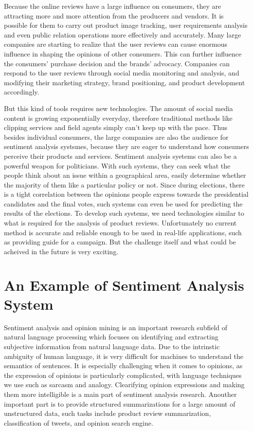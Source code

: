 Because the online reviews have a large influence on consumers, they are attracting more and more attention from the producers and vendors. It is possible for them to carry out product image tracking, user requirements analysis and even public relation operations more effectively and accurately.  
Many large companies are starting to realize that the user reviews can cause enormous influence in shaping the opinions of other consumers. This can further influence the consumers' purchase decision and the brands' advocacy.
Companies can respond to the user reviews through social media monitoring and analysis, and modifying their marketing strategy, brand positioning, and product development accordingly.

But this kind of tools requires new technologies. The amount of social media content is growing exponentially everyday, therefore traditional methods like clipping services and field agents simply can't keep up with the pace. 
Thus besides individual consumers, the large companies are also the audience for sentiment analysis systsmes, because they are eager to understand how consumers perceive their products and services.
Sentiment analysis syetems can also be a powerful weapon for politicians. With such systems, they can seek what the people think about an issue within a geographical area, easily determine whether the majority of them like a particular policy or not. 
Since during elections, there is a tight correlation between the opinions people express towards the presidential candidates and the final votes, such systems can even be used for predicting the results of the elections.
To develop such systems, we need technologies similar to what is required for the analysis of product reviews. Unfortunately no current method is accurate and reliable enough to be used in real-life applications, such as providing guide for a campaign. But the challenge itself and what could be acheived in the future is very exciting.

\section{An Example of Sentiment Analysis System}

Sentiment analysis and opinion mining is an important research subfield of natural language processing which focuses on identifying and extracting subjective information from natural language data. Due to the intrinstic ambiguity of human language, it is very difficult for machines to understand the semantics of sentences. It is especially challenging when it comes to opinions, as the expression of opinions is particularly complicated, with language techniques we use such as sarcasm and analogy. Clearifying opinion expressions and making them more intelligible is a main part of sentiment analysis research. Anouther important part is to provide structured summarizations for a large amount of unstructured data, such tasks include product review summarization, classification of tweets, and opinion search engine. 

